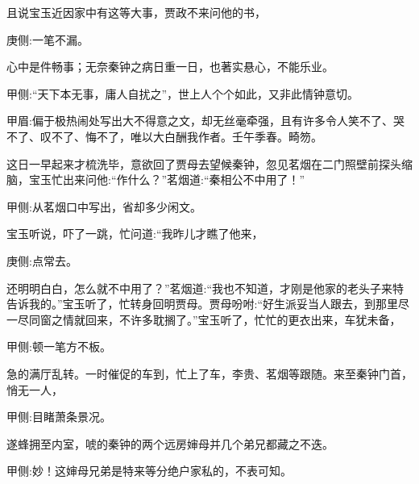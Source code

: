 \begin{parag}
    且说宝玉近因家中有这等大事，贾政不来问他的书，\begin{note}庚侧:一笔不漏。\end{note}心中是件畅事；无奈秦钟之病日重一日，也著实悬心，不能乐业。\begin{note}甲侧:“天下本无事，庸人自扰之”，世上人个个如此，又非此情钟意切。\end{note}\begin{note}甲眉:偏于极热闹处写出大不得意之文，却无丝毫牵强，且有许多令人笑不了、哭不了、叹不了、悔不了，唯以大白酬我作者。壬午季春。畸笏。\end{note}这日一早起来才梳洗毕，意欲回了贾母去望候秦钟，忽见茗烟在二门照壁前探头缩脑，宝玉忙出来问他:“作什么？”茗烟道:“秦相公不中用了！”\begin{note}甲侧:从茗烟口中写出，省却多少闲文。\end{note}宝玉听说，吓了一跳，忙问道:“我昨儿才瞧了他来，\begin{note}庚侧:点常去。\end{note}还明明白白，怎么就不中用了？”茗烟道:“我也不知道，才刚是他家的老头子来特告诉我的。”宝玉听了，忙转身回明贾母。贾母吩咐:“好生派妥当人跟去，到那里尽一尽同窗之情就回来，不许多耽搁了。”宝玉听了，忙忙的更衣出来，车犹未备，\begin{note}甲侧:顿一笔方不板。\end{note}急的满厅乱转。一时催促的车到，忙上了车，李贵、茗烟等跟随。来至秦钟门首，悄无一人，\begin{note}甲侧:目睹萧条景况。\end{note}遂蜂拥至内室，唬的秦钟的两个远房婶母并几个弟兄都藏之不迭。\begin{note}甲侧:妙！这婶母兄弟是特来等分绝户家私的，不表可知。\end{note}
\end{parag}


